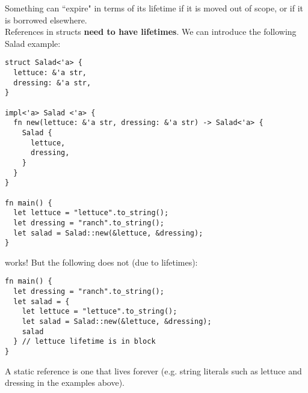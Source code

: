 Something can ``expire" in terms of its lifetime if it is moved out of scope, or if it is borrowed elsewhere. \\

References in structs \textbf{need to have lifetimes}. We can introduce the following Salad example:
\begin{lstlisting}[frame = none]
struct Salad<'a> {
  lettuce: &'a str,
  dressing: &'a str,
}

impl<'a> Salad <'a> {
  fn new(lettuce: &'a str, dressing: &'a str) -> Salad<'a> {
    Salad {
      lettuce,
      dressing,
    }
  }
}

fn main() {
  let lettuce = "lettuce".to_string();
  let dressing = "ranch".to_string();
  let salad = Salad::new(&lettuce, &dressing);
}
\end{lstlisting}

works! But the following does not (due to lifetimes):
\begin{lstlisting}[frame = none]
fn main() {
  let dressing = "ranch".to_string();
  let salad = {
    let lettuce = "lettuce".to_string();
    let salad = Salad::new(&lettuce, &dressing);
    salad
  } // lettuce lifetime is in block
}
\end{lstlisting}

\begin{definition}
A static reference is one that lives forever (e.g. string literals such as lettuce and dressing in the examples above).
\end{definition}
